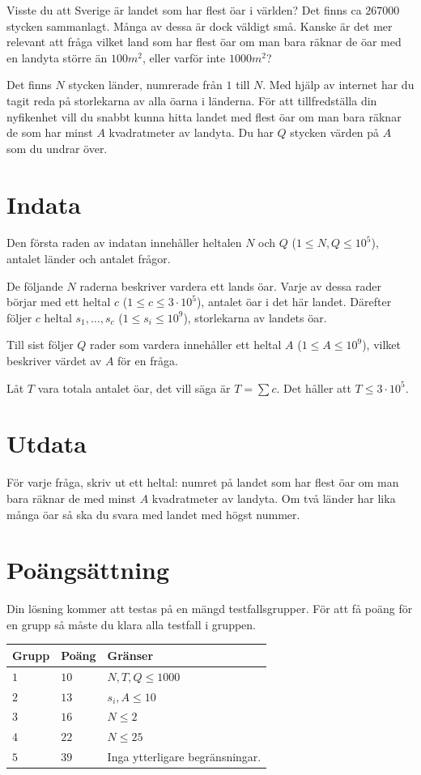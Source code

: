\noindent

Visste du att Sverige är landet som har flest öar i världen? Det finns ca $267000$ stycken sammanlagt.
Många av dessa är dock väldigt små.
Kanske är det mer relevant att fråga vilket land som har flest öar om man bara räknar de öar med en landyta större än $100 m^2$, eller varför inte $1000 m^2$?

Det finns $N$ stycken länder, numrerade från $1$ till $N$.
Med hjälp av internet har du tagit reda på storlekarna av alla öarna i länderna.
För att tillfredställa din nyfikenhet vill du snabbt kunna hitta landet med flest öar om man bara räknar de som har minst $A$ kvadratmeter av landyta.
Du har $Q$ stycken värden på $A$ som du undrar över.

\section*{Indata}
Den första raden av indatan innehåller heltalen $N$ och $Q$ ($1 \leq N, Q \leq 10^5$),
antalet länder och antalet frågor.

De följande $N$ raderna beskriver vardera ett lands öar.
Varje av dessa rader börjar med ett heltal $c$ ($1 \leq c \leq 3 \cdot 10^5$),
antalet öar i det här landet.
Därefter följer $c$ heltal $s_1, \dots, s_c$ ($1 \leq s_i \leq 10^9$), storlekarna av landets öar. 

Till sist följer $Q$ rader som vardera innehåller ett heltal $A$ ($1 \leq A \leq 10^9$), vilket beskriver värdet av $A$ för en fråga.

Låt $T$ vara totala antalet öar, det vill säga är $T = \sum c$. Det håller att $T \leq 3 \cdot 10^5$.

\section*{Utdata}
För varje fråga, skriv ut ett heltal: numret på landet som har flest öar om man bara räknar de med minst $A$ kvadratmeter av landyta.
Om två länder har lika många öar så ska du svara med landet med högst nummer.

\section*{Poängsättning}
Din lösning kommer att testas på en mängd testfallsgrupper.
För att få poäng för en grupp så måste du klara alla testfall i gruppen.

\noindent
\begin{tabular}{| l | l | p{12cm} |}
  \hline
  \textbf{Grupp} & \textbf{Poäng} & \textbf{Gränser} \\ \hline
  $1$    & $10$       & $N, T, Q \leq 1000$ \\ \hline
  $2$    & $13$       & $s_i, A \leq 10$ \\ \hline
  $3$    & $16$       & $N \leq 2$ \\ \hline
  $4$    & $22$       & $N \leq 25$ \\ \hline
  $5$    & $39$       & Inga ytterligare begränsningar. \\ \hline
\end{tabular}

